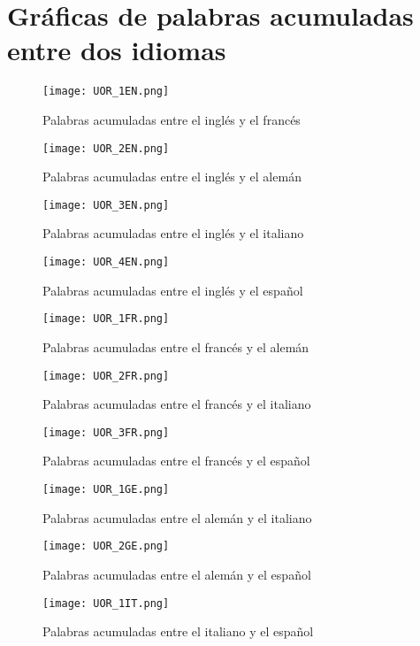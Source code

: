 \clearpage



\section{Gráficas de palabras acumuladas entre dos idiomas}
\label{palabras.acumuladas.apendice}

\begin{figure}[h!]
	\centering
	\texttt{[image: UOR\_1EN.png]}
	\label{fig.SF_EF}
	\caption{Palabras acumuladas entre el inglés y el francés}
\end{figure}


\begin{figure}[h!]
	\centering
	\texttt{[image: UOR\_2EN.png]}
	\label{fig.SF_EG}
	\caption{Palabras acumuladas entre el inglés y el alemán}
\end{figure}


\begin{figure}[h!]
	\centering
	\texttt{[image: UOR\_3EN.png]}
	\label{fig.SF_EI}
	\caption{Palabras acumuladas entre el inglés y el italiano}
\end{figure}

\begin{figure}[h!]
	\centering
	\texttt{[image: UOR\_4EN.png]}
	\label{fig.SF_ES}
	\caption{Palabras acumuladas entre el inglés y el español}
\end{figure}

\begin{figure}[h!]
	\centering
	\texttt{[image: UOR\_1FR.png]}
	\label{fig.SF_FG}
	\caption{Palabras acumuladas entre el francés y el alemán}
\end{figure}

\begin{figure}[h!]
	\centering
	\texttt{[image: UOR\_2FR.png]}
	\label{fig.SF_FI}
	\caption{Palabras acumuladas entre el francés y el italiano}
\end{figure}

\begin{figure}[h!]
	\centering
	\texttt{[image: UOR\_3FR.png]}
	\label{fig.SF_FS}
	\caption{Palabras acumuladas entre el francés y el español}
\end{figure}



\begin{figure}[h!]
	\centering
	\texttt{[image: UOR\_1GE.png]}
	\label{fig.SF_GI}
	\caption{Palabras acumuladas entre el alemán y el italiano}
\end{figure}


\begin{figure}[h!]
	\centering
	\texttt{[image: UOR\_2GE.png]}
	\label{fig.SF_GS}
	\caption{Palabras acumuladas entre el alemán y el español}
\end{figure}


\begin{figure}[h!]
	\centering
	\texttt{[image: UOR\_1IT.png]}
	\label{fig.SF_IS}
	\caption{Palabras acumuladas entre el italiano y el español}
\end{figure}
